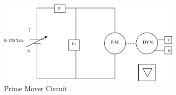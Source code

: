 \documentclass{article}
\begin{document}
\begin{figure}[H]
  \centering
  \includegraphics[width=0.8\textwidth]{img/circuit_02}
  \caption{Prime Mover Circuit}
  \label{fig:circuit_02}
\end{figure}
\end{document}
